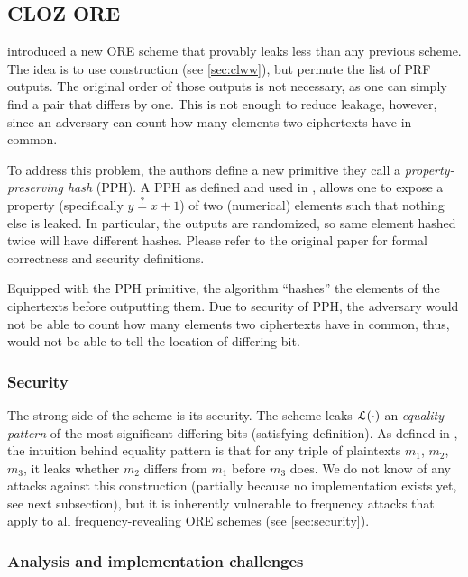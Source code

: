 \subsection{CLOZ ORE}

	\textcite{parameter-hiding-ore} introduced a new ORE scheme that provably leaks less than any previous scheme.
	The idea is to use \textcite{clww-ore} construction (see \cref{sec:clww}), but permute the list of PRF outputs.
	The original order of those outputs is not necessary, as one can simply find a pair that differs by one.
	This is not enough to reduce leakage, however, since an adversary can count how many elements two ciphertexts have in common.

	To address this problem, the authors define a new primitive they call a \emph{property-preserving hash} (PPH).
	A PPH as defined and used in \cite{parameter-hiding-ore}, allows one to expose a property (specifically $y \overset{?}{=} x + 1$) of two (numerical) elements such that nothing else is leaked.
	In particular, the outputs are randomized, so same element hashed twice will have different hashes.
	Please refer to the original paper \cite{parameter-hiding-ore} for formal correctness and security definitions.

	Equipped with the PPH primitive, the algorithm ``hashes'' the elements of the ciphertexts before outputting them.
	Due to security of PPH, the adversary would not be able to count how many elements two ciphertexts have in common, thus, would not be able to tell the location of differing bit.

	\subsubsection{Security}
		The strong side of the scheme is its security.
		The scheme leaks $\mathcal{L}(\cdot)$ an \emph{equality pattern} of the most-significant differing bits (satisfying \textcite{clww-ore} definition).
		As defined in \cite{parameter-hiding-ore}, the intuition behind equality pattern is that for any triple of plaintexts $m_1$, $m_2$, $m_3$, it leaks whether $m_2$ differs from $m_1$ before $m_3$ does. %
		We do not know of any attacks against this construction (partially because no implementation exists yet, see next subsection), but it is inherently vulnerable to frequency attacks that apply to all frequency-revealing ORE schemes (see \cref{sec:security}).

	\subsubsection{Analysis and implementation challenges}

